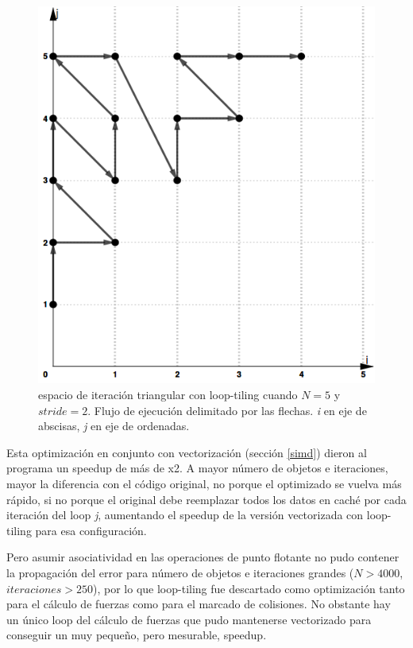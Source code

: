 \documentclass{article}
\begin{document}
\begin{figure}[h!]
	\centering
	\includegraphics[width=0.6\linewidth,height=0.6\textwidth]{resources/loop_anidado_tiling_505x565.png}
	\caption{espacio de iteración triangular con loop-tiling cuando $N=5$ y $stride=2$. Flujo de ejecución
	delimitado por las flechas. \textit{i} en eje de abscisas, \textit{j} en eje de ordenadas.}
	\label{fig:no_tiling}
\end{figure}


Esta optimización en conjunto con vectorización (sección \ref{simd}) dieron al programa un speedup de más de x2.
A mayor número de objetos e iteraciones, mayor la diferencia con el código original, no porque el optimizado se
vuelva más rápido, si no porque el original debe reemplazar todos los datos en caché por cada iteración del loop \textit{j},
aumentando el speedup de la versión vectorizada con loop-tiling para esa configuración.


Pero asumir asociatividad en las operaciones de punto flotante no pudo contener la propagación del error
para número de objetos e iteraciones grandes ($N > 4000$, $iteraciones > 250$), por lo que loop-tiling fue descartado
como optimización tanto para el cálculo de fuerzas como para el marcado de colisiones. No obstante hay un único loop del cálculo de fuerzas que pudo mantenerse vectorizado para conseguir un muy pequeño, pero
mesurable, speedup.
\end{document}
